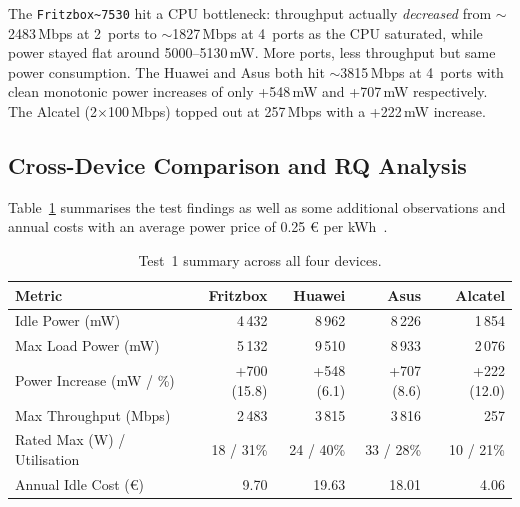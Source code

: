 The \verb|Fritzbox~7530| hit a \ac{CPU} bottleneck: throughput actually \emph{decreased} from $\sim$2483\,Mbps at 2~ports to $\sim$1827\,Mbps at 4~ports as the \ac{CPU} saturated, while power stayed flat around 5000--5130\,mW. More ports, less throughput but same power consumption.
The Huawei and Asus both hit $\sim$3815\,Mbps at 4~ports with clean monotonic power increases of only +548\,mW and +707\,mW respectively.
The Alcatel (2$\times$100\,Mbps) topped out at 257\,Mbps with a +222\,mW increase.

\subsection{Cross-Device Comparison and RQ Analysis}
\label{sec:cross-device-comparison}

Table~\ref{tab:results-summary} summarises the test findings as well as some additional observations and annual costs with an average power price of 0.25 \euro{} per kWh~\cite{bib:eurostat-electricity}.

\begin{table}[H]
    \centering
    \caption{Test~1 summary across all four devices.}
    \label{tab:results-summary}
    \small\renewcommand{\arraystretch}{0.88}
    \begin{tabular}{l r r r r}
        \toprule
        \textbf{Metric} & \textbf{Fritzbox} & \textbf{Huawei} & \textbf{Asus} & \textbf{Alcatel} \\
        \midrule
        Idle Power (mW)              & 4\,432  & 8\,962  & 8\,226  & 1\,854 \\
        Max Load Power (mW)          & 5\,132  & 9\,510  & 8\,933  & 2\,076 \\
        Power Increase (mW / \%)     & +700 (15.8) & +548 (6.1) & +707 (8.6) & +222 (12.0) \\
        Max Throughput (Mbps)        & 2\,483  & 3\,815  & 3\,816  & 257 \\
        Rated Max (W) / Utilisation  & 18 / 31\% & 24 / 40\% & 33 / 28\% & 10 / 21\% \\
        Annual Idle Cost (\euro{})   & 9.70 & 19.63 & 18.01 & 4.06 \\
        \bottomrule
    \end{tabular}
\end{table}


